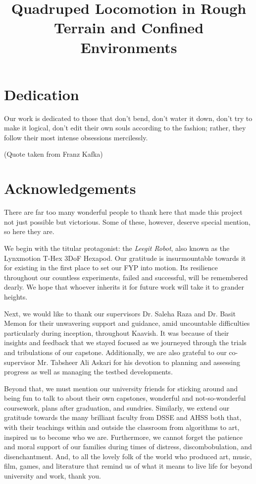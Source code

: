 \documentclass[12pt,twoside]{report}
\title{Quadruped Locomotion in Rough Terrain and Confined Environments}
\begin{document}

\chapter*{Dedication}
Our work is dedicated to those that don’t bend, don’t water it down, don’t try to make it logical, don’t edit their own souls according to the fashion; rather, they follow their most intense obsessions mercilessly.

(Quote taken from Franz Kafka)

\chapter*{Acknowledgements}
There are far too many wonderful people to thank here that made this project not just possible but victorious. Some of these, however, deserve special mention, so here they are.

We begin with the titular protagonist: the \textit{Leegit Robot}, also known as the Lynxmotion T-Hex 3DoF Hexapod. Our gratitude is insurmountable towards it for existing in the first place to set our FYP into motion. Its resilience throughout our countless experiments, failed and successful, will be remembered dearly. We hope that whoever inherits it for future work will take it to grander heights.

Next, we would like to thank our supervisors Dr. Saleha Raza and Dr. Basit Memon for their unwavering support and guidance, amid uncountable difficulties particularly during inception, throughout Kaavish. It was because of their insights and feedback that we stayed focused as we journeyed through the trials and tribulations of our capstone. Additionally, we are also grateful to our co-supervisor Mr. Tabsheer Ali Askari for his devotion to planning and assessing progress as well as managing the testbed developments. 

Beyond that, we must mention our university friends for sticking around and being fun to talk to about their own capstones, wonderful and not-so-wonderful coursework, plans after graduation, and sundries. Similarly, we extend our gratitude towards the many brilliant faculty from DSSE and AHSS both that, with their teachings within and outside the classroom from algorithms to art, inspired us to become who we are. Furthermore, we cannot forget the patience and moral support of our families during times of distress, discombobulation, and disenchantment. And, to all the lovely folk of the world who produced art, music, film, games, and literature that remind us of what it means to live life for beyond university and work, thank you.  
\end{document}

